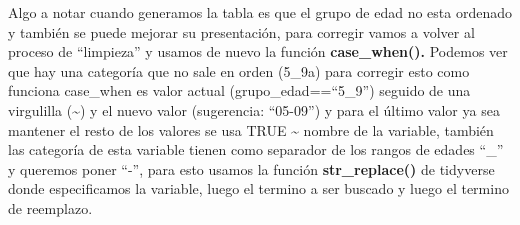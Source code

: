 \documentclass[
  letterpaper,
  DIV=11,
  numbers=noendperiod]{scrreprt}
\begin{document}
Algo a notar cuando generamos la tabla es que el grupo de edad no esta
ordenado y también se puede mejorar su presentación, para corregir vamos
a volver al proceso de ``limpieza'' y usamos de nuevo la función
\textbf{case\_when().} Podemos ver que hay una categoría que no sale en
orden (5\_9a) para corregir esto como funciona case\_when es valor
actual (grupo\_edad==``5\_9'') seguido de una virgulilla
(\textasciitilde) y el nuevo valor (sugerencia: ``05-09'') y para el
último valor ya sea mantener el resto de los valores se usa TRUE
\textasciitilde{} nombre de la variable, también las categoría de esta
variable tienen como separador de los rangos de edades ``\_'' y queremos
poner ``-'', para esto usamos la función \textbf{str\_replace()} de
tidyverse donde especificamos la variable, luego el termino a ser
buscado y luego el termino de reemplazo.
\end{document}
